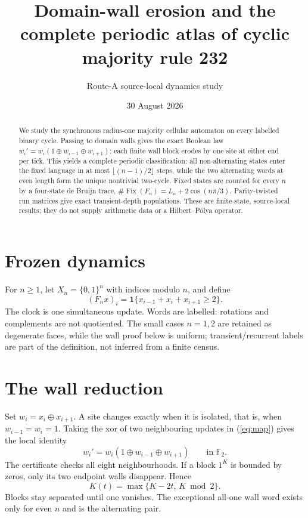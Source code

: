 \documentclass[10pt]{article}
\title{Domain-wall erosion and the complete periodic atlas of cyclic majority rule 232}
\author{Route-A source-local dynamics study}
\date{30 August 2026}
\newcommand{\F}{\mathbb F_2}
\newcommand{\Fix}{\operatorname{Fix}}
\begin{document}
\maketitle

\begin{abstract}
We study the synchronous radius-one majority cellular automaton on every
labelled binary cycle.  Passing to domain walls gives the exact Boolean law
$w_i'=w_i(1\oplus w_{i-1}\oplus w_{i+1})$: each finite wall block erodes by one
site at either end per tick.  This yields a complete periodic classification:
all non-alternating states enter the fixed language in at most
$\lfloor(n-1)/2\rfloor$ steps, while the two alternating words at even length
form the unique nontrivial two-cycle.  Fixed states are counted for every
$n$ by a four-state de Bruijn trace,
$\#\Fix(F_n)=L_n+2\cos(n\pi/3)$.  Parity-twisted run matrices give exact
transient-depth populations.  These are finite-state, source-local results;
they do not supply arithmetic data or a Hilbert--Pólya operator.
\end{abstract}

\section{Frozen dynamics}
For $n\geq1$, let $X_n=\{0,1\}^n$ with indices modulo $n$, and define
\begin{equation}
 (F_nx)_i=\mathbf 1\{x_{i-1}+x_i+x_{i+1}\geq2\}.
 \label{eq:map}
\end{equation}
The clock is one simultaneous update.  Words are labelled: rotations and
complements are not quotiented.  The small cases $n=1,2$ are retained as
degenerate faces, while the wall proof below is uniform; transient/recurrent
labels are part of the definition, not inferred from a finite census.

\section{The wall reduction}
Set $w_i=x_i\oplus x_{i+1}$.  A site changes exactly when it is isolated,
that is, when $w_{i-1}=w_i=1$.  Taking the xor of two neighbouring updates in
(\ref{eq:map}) gives the local identity
\begin{equation}
 w_i'=w_i(1\oplus w_{i-1}\oplus w_{i+1})\qquad\text{in }\F.
 \label{eq:wall}
\end{equation}
The certificate checks all eight neighbourhoods.  If a block $1^K$ is bounded
by zeros, only its two endpoint walls disappear.  Hence
\begin{equation}
 K(t)=\max\{K-2t,\,K\bmod2\}.
 \label{eq:erosion}
\end{equation}
Blocks stay separated until one vanishes.  The exceptional all-one wall word
exists only for even $n$ and is the alternating pair.
\end{document}
